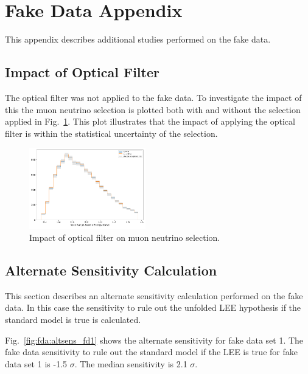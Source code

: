 \section{Fake Data Appendix}{}
\label{sec:fakedataappendix}

This appendix describes additional studies performed on the fake data.

\subsection{Impact of Optical Filter}

The optical filter was not applied to the fake data.  To investigate the impact of this the muon neutrino selection is plotted both with and without the selection applied in Fig.~\ref{fig:fda:opfilter}. This plot illustrates that the impact of applying the optical filter is within the statistical uncertainty of the selection.

\begin{figure}[H]
\begin{center}
\includegraphics[width=0.45\textwidth]{Fakedata/appendix/opfilter.pdf}
\caption{\label{fig:fda:opfilter} Impact of optical filter on muon neutrino selection.}
\end{center}
\end{figure}

\subsection{Alternate Sensitivity Calculation}
This section describes an alternate sensitivity calculation performed on the fake data.  In this case the sensitivity to rule out the unfolded LEE hypothesis if the standard model is true is calculated. 

Fig.~\ref{fig:fda:altsens_fd1} shows the alternate sensitivity for fake data set 1. The fake data sensitivity to  rule out the standard model if the LEE is true for fake data set 1 is -1.5 $\sigma$. The median sensitivity is 2.1 $\sigma$. 

